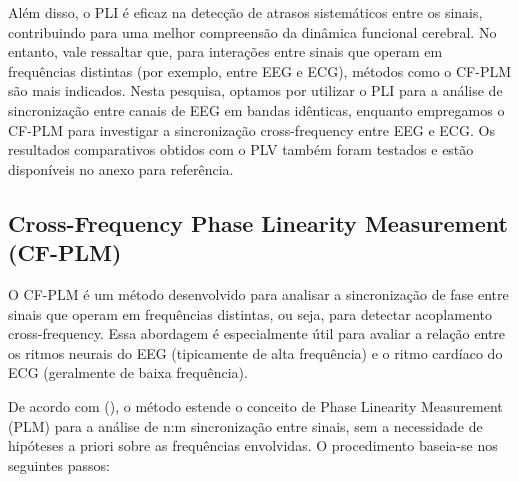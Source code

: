 Além disso, o PLI é eficaz na detecção de atrasos sistemáticos entre os sinais, contribuindo para uma melhor compreensão da dinâmica funcional cerebral. No entanto, vale ressaltar que, para interações entre sinais que operam em frequências distintas (por exemplo, entre EEG e ECG), métodos como o CF-PLM são mais indicados. Nesta pesquisa, optamos por utilizar o PLI para a análise de sincronização entre canais de EEG em bandas idênticas, enquanto empregamos o CF-PLM para investigar a sincronização cross-frequency entre EEG e ECG. Os resultados comparativos obtidos com o PLV também foram testados e estão disponíveis no anexo para referência.

\subsection{Cross-Frequency Phase Linearity Measurement (CF-PLM)}

O CF-PLM é um método desenvolvido para analisar a sincronização de fase entre sinais que operam em frequências distintas, ou seja, para detectar acoplamento cross-frequency. Essa abordagem é especialmente útil para avaliar a relação entre os ritmos neurais do EEG (tipicamente de alta frequência) e o ritmo cardíaco do ECG (geralmente de baixa frequência). 

De acordo com \citeauthor{sorrentino2022detection} (\citeyear{sorrentino2022detection}), o método estende o conceito de Phase Linearity Measurement (PLM) para a análise de n:m sincronização entre sinais, sem a necessidade de hipóteses a priori sobre as frequências envolvidas. O procedimento baseia-se nos seguintes passos:

